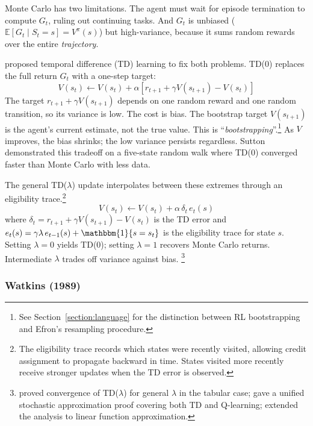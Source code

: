 Monte Carlo has two limitations. The agent must wait for episode termination to compute $G_t$, ruling out continuing tasks. And $G_t$ is unbiased ($\mathbb{E}[G_t \mid S_t = s] = V^\pi(s)$) but high-variance, because it sums random rewards over the entire \textit{trajectory}.

\citet{sutton1988} proposed temporal difference (TD) learning to fix both problems. TD(0) replaces the full return $G_t$ with a one-step target:
\begin{equation}
V(s_t) \leftarrow V(s_t) + \alpha \left[ r_{t+1} + \gamma V(s_{t+1}) - V(s_t) \right]
\end{equation}
The target $r_{t+1} + \gamma V(s_{t+1})$ depends on one random reward and one random transition, so its variance is low. The cost is bias. The bootstrap target $V(s_{t+1})$ is the agent's current estimate, not the true value. This is ``\textit{bootstrapping}''.\footnote{See Section~\ref{section:language} for the distinction between RL bootstrapping and Efron's resampling procedure.} As $V$ improves, the bias shrinks; the low variance persists regardless. Sutton demonstrated this tradeoff on a five-state random walk where TD(0) converged faster than Monte Carlo with less data.

The general TD($\lambda$) update interpolates between these extremes through an eligibility trace.\footnote{The eligibility trace records which states were recently visited, allowing credit assignment to propagate backward in time. States visited more recently receive stronger updates when the TD error is observed.}
\begin{equation}
V(s_t) \leftarrow V(s_t) + \alpha \, \delta_t \, e_t(s)
\end{equation}
where $\delta_t = r_{t+1} + \gamma V(s_{t+1}) - V(s_t)$ is the TD error and $e_t(s) = \gamma \lambda \, e_{t-1}(s) + \mathbbm{1}\{s = s_t\}$ is the eligibility trace for state $s$. Setting $\lambda = 0$ yields TD(0); setting $\lambda = 1$ recovers Monte Carlo returns. Intermediate $\lambda$ trades off variance against bias. \footnote{\citet{dayan1992} proved convergence of TD($\lambda$) for general $\lambda$ in the tabular case; \citet{jaakkola1994} gave a unified stochastic approximation proof covering both TD and Q-learning; \citet{tsitsiklis1997} extended the analysis to linear function approximation.}

\subsubsection{Watkins (1989)}

